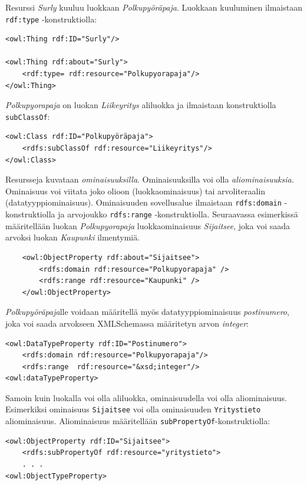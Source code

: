 \documentclass[finnish]{tktltiki2}
\theoremstyle{definition}
\theoremstyle{remark}
\begin{document}
Resurssi \textit{Surly} kuuluu luokkaan \textit{Polkupyöräpaja}. Luokkaan kuuluminen ilmaistaan \texttt{rdf:type} -konstruktiolla:

\begin{verbatim}
<owl:Thing rdf:ID="Surly"/>

<owl:Thing rdf:about="Surly">
    <rdf:type= rdf:resource="Polkupyorapaja"/>
</owl:Thing>
\end{verbatim} 

\textit{Polkupyorapaja} on luokan \textit{Liikeyritys} aliluokka ja ilmaistaan konstruktiolla \texttt{subClassOf}: 

\begin{verbatim}
<owl:Class rdf:ID="Polkupyöräpaja">
    <rdfs:subClassOf rdf:resource="Liikeyritys"/>
</owl:Class>
\end{verbatim}

Resursseja kuvataan \textit{ominaisuuksilla}. Ominaisuuksilla voi olla \textit{aliominaisuuksia}. Ominaisuus voi viitata joko olioon (luokkaominaisuus) tai arvoliteraalin (datatyyppiominaisuus). Ominaisuuden sovellusalue ilmaistaan \texttt{rdfs:domain} -konstruktiolla ja arvojoukko \texttt{rdfs:range} -konstruktiolla. Seuraavassa esimerkissä 
määritellään luokan \textit{Polkupyorapaja} luokkaominaisuus \textit{Sijaitsee}, joka voi saada arvoksi luokan \textit{Kaupunki} ilmentymiä.

\begin{verbatim}
    <owl:ObjectProperty rdf:about="Sijaitsee">
        <rdfs:domain rdf:resource="Polkupyorapaja" />
        <rdfs:range rdf:resource="Kaupunki" />
    </owl:ObjectProperty>
\end{verbatim}

\textit{Polkupyöräpaja}lle voidaan määritellä myös datatyyppiominaisuus \textit{postinumero}, joka voi saada arvokseen XMLSchemassa määritetyn arvon \textit{integer}:

\begin{verbatim}
<owl:DataTypeProperty rdf:ID="Postinumero">
    <rdfs:domain rdf:resource="Polkupyorapaja"/>
    <rdfs:range  rdf:resource="&xsd;integer"/>   
<owl:dataTypeProperty>
\end{verbatim}

Samoin kuin luokalla voi olla aliluokka, ominaisuudella voi olla aliominaisuus. Esimerkiksi ominaisuus \texttt{Sijaitsee} voi olla ominaisuuden \texttt{Yritystieto} aliominaisuus. Aliominaisuus
määritellään \texttt{subPropertyOf}-konstruktiolla:

\begin{verbatim}
<owl:ObjectProperty rdf:ID="Sijaitsee">
    <rdfs:subPropertyOf rdf:resource="yritystieto">
    . . .
<owl:ObjectTypeProperty>
\end{verbatim}
\end{document}
